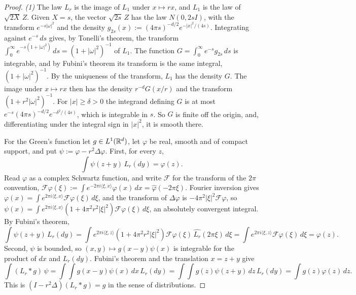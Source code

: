 \begin{proof}
\leanok
\emph{(1)} The law $L_r$ is the image of $L_1$ under $x \mapsto rx$, and $L_1$ is the law of
$\sqrt{2X}\,Z$. Given $X = s$, the vector $\sqrt{2s}\,Z$ has the law $N(0, 2sI)$, with the transform
$e^{-s|\omega|^2}$ and the density $g_{2s}(x) := (4\pi s)^{-d/2}e^{-|x|^2/(4s)}$. Integrating against
$e^{-s}\,ds$ gives, by Tonelli's theorem, the transform
$\int_0^\infty e^{-s(1 + |\omega|^2)}\,ds = (1 + |\omega|^2)^{-1}$ of $L_1$. The function
$G = \int_0^\infty e^{-s}g_{2s}\,ds$ is integrable, and by Fubini's theorem its transform is the same
integral, $(1 + |\omega|^2)^{-1}$. By the uniqueness of the transform, $L_1$ has the density $G$.
The image under $x \mapsto rx$ then has the density $r^{-d}G(x/r)$ and the transform
$(1 + r^2|\omega|^2)^{-1}$. For $|x| \ge \delta > 0$ the integrand defining $G$ is at most
$e^{-s}(4\pi s)^{-d/2}e^{-\delta^2/(4s)}$, which is integrable in $s$. So $G$ is finite off the
origin, and, differentiating under the integral sign in $|x|^2$, it is smooth there.

For the Green's function let $g \in L^1(\mathbb{R}^d)$, let $\varphi$ be real, smooth and of compact
support, and put $\psi := \varphi - r^2\Delta\varphi$. First, for every $z$,
\[
  \int\psi(z + y)\,L_r(dy) = \varphi(z) .
\]
Read $\varphi$ as a complex Schwartz function, and write $\mathcal{F}$ for the transform of the
$2\pi$ convention, $\mathcal{F}\varphi(\xi) := \int e^{-2\pi i\langle\xi, x\rangle}\varphi(x)\,dx =
\widehat\varphi(-2\pi\xi)$. Fourier inversion gives
$\varphi(x) = \int e^{2\pi i\langle\xi, x\rangle}\mathcal{F}\varphi(\xi)\,d\xi$, and the transform of
$\Delta\varphi$ is $-4\pi^2|\xi|^2\mathcal{F}\varphi$, so
$\psi(x) = \int e^{2\pi i\langle\xi, x\rangle}(1 + 4\pi^2r^2|\xi|^2)\mathcal{F}\varphi(\xi)\,d\xi$, an
absolutely convergent integral. By Fubini's theorem,
\[
  \int\psi(z + y)\,L_r(dy)
   = \int e^{2\pi i\langle\xi, z\rangle}(1 + 4\pi^2r^2|\xi|^2)\mathcal{F}\varphi(\xi)\,
     \widehat{L_r}(2\pi\xi)\,d\xi
   = \int e^{2\pi i\langle\xi, z\rangle}\mathcal{F}\varphi(\xi)\,d\xi = \varphi(z) .
\]
Second, $\psi$ is bounded, so $(x, y) \mapsto g(x - y)\psi(x)$ is integrable for
the product of $dx$ and $L_r(dy)$. Fubini's theorem and the translation $x = z + y$ give
\[
  \int(L_r * g)\,\psi = \int\int g(x - y)\psi(x)\,dx\,L_r(dy)
   = \int\int g(z)\psi(z + y)\,dz\,L_r(dy) = \int g(z)\varphi(z)\,dz .
\]
This is $(I - r^2\Delta)(L_r * g) = g$ in the sense of distributions.


\end{proof}
